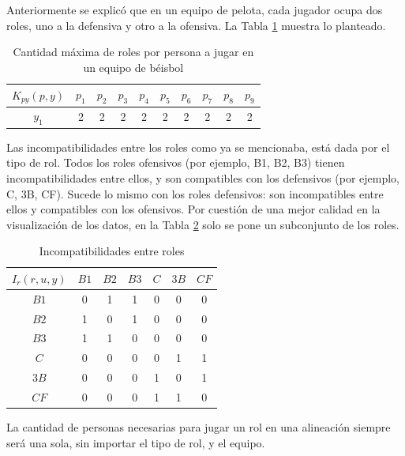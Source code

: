 

Anteriormente se explicó que en un equipo de pelota, cada jugador ocupa dos roles, uno a la defensiva y otro a la ofensiva. La Tabla \ref{cmrpp-pel} muestra lo planteado.
\begin{table}[H]
	\centering
	\caption{Cantidad máxima de roles por persona a jugar en un equipo de béisbol }\label{cmrpp-pel}
	\begin{tabular}{|c|c|c|c|c|c|c|c|c|c|}
		\hline
		$K_{py}(p,y)$ & $p_1$ & $p_2$ & $p_3$  & $p_4$ & $p_5$ & $p_6$ & $p_7$  & $p_8$ & $p_9$ \\ \hline
		$y_1$ & 2 & 2 & 2 & 2 & 2 & 2 & 2 & 2 & 2 \\ \hline
	\end{tabular}
\end{table}


Las incompatibilidades entre los roles como ya se mencionaba, está dada por el tipo de rol. Todos los roles ofensivos (por ejemplo, B1, B2, B3) tienen incompatibilidades entre ellos, y son compatibles con los defensivos (por ejemplo, C, 3B, CF). Sucede lo mismo con los roles defensivos: son incompatibles entre ellos y compatibles con los ofensivos. Por cuestión de una mejor calidad en la visualización de los datos, en la Tabla \ref{ier1-pel} solo se pone un subconjunto de los roles.
\begin{table}[H]
	\centering
	\caption{Incompatibilidades entre roles}\label{ier1-pel}
	\begin{tabular}{|c|c|c|c|c|c|c|}
		\hline
		$I_r(r,u,y)$  & $B1$& $B2$& $B3$& $C$ & $3B$& $CF$  \\ \hline
		$B1$ 			&  0  &  1  &  1  &  0  &  0  &  0 \\ \hline
		$B2$ 			&  1  &  0  &  1  &  0  &  0  &  0 \\ \hline
		$B3$ 			&  1  &  1  &  0  &  0  &  0  &  0 \\ \hline
		$C$		    	&  0  &  0  &  0  &  0  &  1  &  1 \\ \hline
		$3B$			&  0  &  0  &  0  &  1  &  0  &  1 \\ \hline
		$CF$ 			&  0  &  0  &  0  &  1  &  1  &  0 \\ \hline
	\end{tabular}
\end{table}


La cantidad de personas necesarias para jugar un rol en una alineación siempre será una sola, sin importar el tipo de rol, y el equipo.\\

